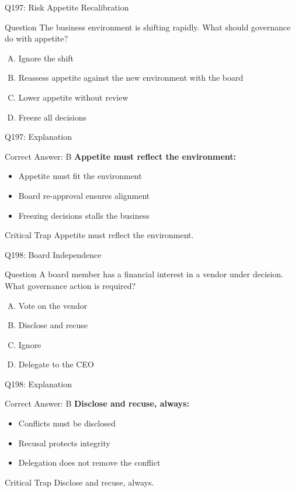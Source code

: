 \documentclass{beamer}
\begin{document}
	\begin{frame}{Q197: Risk Appetite Recalibration}
		\begin{block}{Question}
			The business environment is shifting rapidly. What should governance do with appetite?
		\end{block}
		\begin{enumerate}[(A)]
			\item Ignore the shift
			\item Reassess appetite against the new environment with the board
			\item Lower appetite without review
			\item Freeze all decisions
		\end{enumerate}
	\end{frame}
	
	\begin{frame}{Q197: Explanation}
		\begin{block}{Correct Answer: B}
			\textbf{Appetite must reflect the environment:}
			\begin{itemize}
				\item Appetite must fit the environment
				\item Board re-approval ensures alignment
				\item Freezing decisions stalls the business
			\end{itemize}
		\end{block}
		\begin{alertblock}{Critical Trap}
			Appetite must reflect the environment.
		\end{alertblock}
	\end{frame}
	
	\begin{frame}{Q198: Board Independence}
		\begin{block}{Question}
			A board member has a financial interest in a vendor under decision. What governance action is required?
		\end{block}
		\begin{enumerate}[(A)]
			\item Vote on the vendor
			\item Disclose and recuse
			\item Ignore
			\item Delegate to the CEO
		\end{enumerate}
	\end{frame}
	
	\begin{frame}{Q198: Explanation}
		\begin{block}{Correct Answer: B}
			\textbf{Disclose and recuse, always:}
			\begin{itemize}
				\item Conflicts must be disclosed
				\item Recusal protects integrity
				\item Delegation does not remove the conflict
			\end{itemize}
		\end{block}
		\begin{alertblock}{Critical Trap}
			Disclose and recuse, always.
		\end{alertblock}
	\end{frame}
	
\end{document}
